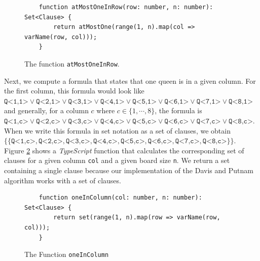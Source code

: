 \begin{figure}[!ht]
  \centering
\begin{verbatim}
    function atMostOneInRow(row: number, n: number): Set<Clause> {
        return atMostOne(range(1, n).map(col => varName(row, col)));
    }
\end{verbatim}
\vspace*{-0.3cm}
  \caption{The function \texttt{atMostOneInRow}.}
  \label{fig:atMostOneInRow}
\end{figure}
Next, we compute a formula that states that  one queen is in a given
column. For the first column, this formula would look like
\\[0.2cm]
\hspace*{1.3cm}
$\texttt{Q<1,1>} \vee \texttt{Q<2,1>} \vee \texttt{Q<3,1>} \vee \texttt{Q<4,1>} \vee \texttt{Q<5,1>} \vee
\texttt{Q<6,1>} \vee \texttt{Q<7,1>} \vee \texttt{Q<8,1>}$
\\[0.2cm]
and generally, for a column $c$ where $c \in \{1,\cdots,8\}$, the formula is
\\[0.2cm]
\hspace*{1.3cm}
$\texttt{Q<1,c>} \vee \texttt{Q<2,c>} \vee \texttt{Q<3,c>} \vee \texttt{Q<4,c>} \vee \texttt{Q<5,c>} \vee
\texttt{Q<6,c>} \vee \texttt{Q<7,c>} \vee \texttt{Q<8,c>}$.
\\[0.2cm]
When we write this formula in set notation as a set of clauses, we obtain
\\[0.2cm]
\hspace*{1.3cm}
$\bigl\{ \{\texttt{Q<1,c>} , \texttt{Q<2,c>} , \texttt{Q<3,c>} , \texttt{Q<4,c>} , \texttt{Q<5,c>} ,
\texttt{Q<6,c>} , \texttt{Q<7,c>} , \texttt{Q<8,c>} \}\bigr\}$.
\\[0.2cm]
Figure \ref{fig:oneInColumn} shows a \textsl{TypeScript} function that calculates the corresponding set of clauses for a given column
\texttt{col} and a given board size \texttt{n}.
We return a set containing  a single clause because our implementation of the Davis and Putnam algorithm
works with a set of clauses.

\begin{figure}[!ht]
  \centering
\begin{verbatim}
    function oneInColumn(col: number, n: number): Set<Clause> {
        return set(range(1, n).map(row => varName(row, col)));
    }
\end{verbatim}
\vspace*{-0.3cm}
  \caption{The Function \texttt{oneInColumn}}
  \label{fig:oneInColumn}
\end{figure}

